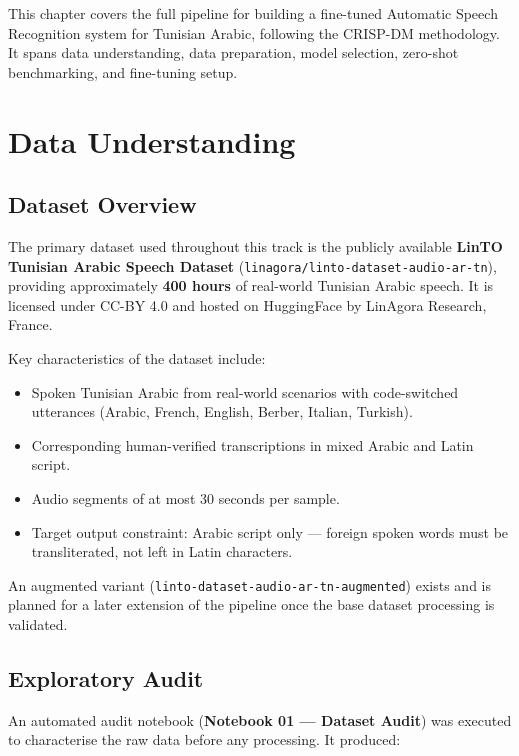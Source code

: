 \documentclass[12pt,a4paper]{report}
\begin{document}
This chapter covers the full pipeline for building a fine-tuned Automatic Speech Recognition
system for Tunisian Arabic, following the CRISP-DM methodology. It spans data understanding,
data preparation, model selection, zero-shot benchmarking, and fine-tuning setup.

\section{Data Understanding}

\subsection{Dataset Overview}

The primary dataset used throughout this track is the publicly available
\textbf{LinTO Tunisian Arabic Speech Dataset}
(\texttt{linagora/linto-dataset-audio-ar-tn}), providing approximately \textbf{400 hours}
of real-world Tunisian Arabic speech. It is licensed under CC-BY 4.0 and hosted on
HuggingFace by LinAgora Research, France.

Key characteristics of the dataset include:

\begin{itemize}
    \item Spoken Tunisian Arabic from real-world scenarios with code-switched utterances
    (Arabic, French, English, Berber, Italian, Turkish).
    \item Corresponding human-verified transcriptions in mixed Arabic and Latin script.
    \item Audio segments of at most 30 seconds per sample.
    \item Target output constraint: Arabic script only — foreign spoken words must be
    transliterated, not left in Latin characters.
\end{itemize}

An augmented variant (\texttt{linto-dataset-audio-ar-tn-augmented}) exists and is planned
for a later extension of the pipeline once the base dataset processing is validated.

\subsection{Exploratory Audit}

An automated audit notebook (\textbf{Notebook 01 — Dataset Audit}) was executed to
characterise the raw data before any processing. It produced:
\end{document}
